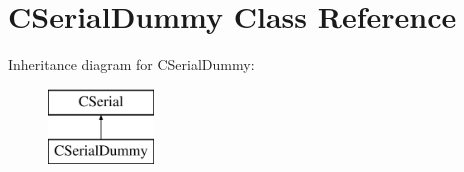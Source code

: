 \hypertarget{classCSerialDummy}{\section{C\-Serial\-Dummy Class Reference}
\label{classCSerialDummy}
}
Inheritance diagram for C\-Serial\-Dummy\-:\begin{figure}[H]
\begin{center}
\leavevmode
\includegraphics[height=2.000000cm]{classCSerialDummy}
\end{center}
\end{figure}
